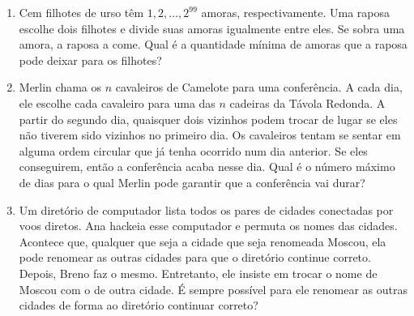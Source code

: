 \documentclass{article}
\begin{document}
\begin{enumerate}
    \item Cem filhotes de urso têm $1,2,\dots,2^{99}$ amoras, respectivamente.
    Uma raposa escolhe dois filhotes e divide suas amoras igualmente entre eles.
    Se sobra uma amora, a raposa a come.
    Qual é a quantidade mínima de amoras que a raposa pode deixar para os filhotes?
    
    \item Merlin chama os $n$ cavaleiros de Camelote para uma conferência.
    A cada dia, ele escolhe cada cavaleiro para uma das $n$ cadeiras da Távola Redonda.
    A partir do segundo dia, quaisquer dois vizinhos
    podem trocar de lugar se eles não tiverem sido vizinhos no primeiro dia.
    Os cavaleiros tentam se sentar em alguma ordem circular que já tenha ocorrido num dia anterior.
    Se eles conseguirem, então a conferência acaba nesse dia.
    Qual é o número máximo de dias para o qual Merlin pode garantir que a conferência vai durar?
    
    \item Um diretório de computador lista todos os pares de cidades conectadas por voos diretos.
    Ana hackeia esse computador e permuta os nomes das cidades.
    Acontece que, qualquer que seja a cidade que seja renomeada Moscou,
    ela pode renomear as outras cidades para que o diretório continue correto.
    Depois, Breno faz o mesmo.
    Entretanto, ele insiste em trocar o nome de Moscou com o de outra cidade.
    É sempre possível para ele renomear as outras cidades
    de forma ao diretório continuar correto?
\end{enumerate}
\end{document}
